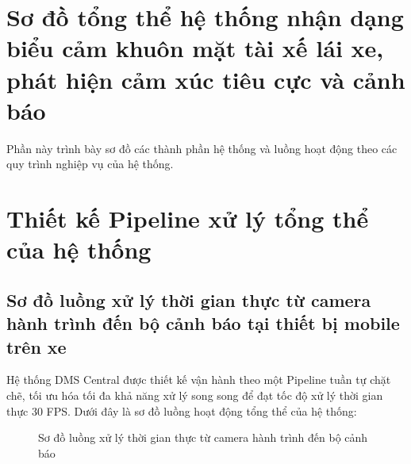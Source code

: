 \documentclass[../DoAn.tex]{subfiles}
\begin{document}
\section{Sơ đồ tổng thể hệ thống nhận dạng biểu cảm khuôn mặt tài xế lái xe, phát hiện cảm xúc tiêu cực và cảnh báo}
\label{section:4.1}
Phần này trình bày sơ đồ các thành phần hệ thống và luồng hoạt động theo các quy trình nghiệp vụ của hệ thống.

\section{Thiết kế Pipeline xử lý tổng thể của hệ thống}
\label{section:4.2}

\subsection{Sơ đồ luồng xử lý thời gian thực từ camera hành trình đến bộ cảnh báo tại thiết bị mobile trên xe}
Hệ thống DMS Central được thiết kế vận hành theo một Pipeline tuần tự chặt chẽ, tối ưu hóa tối đa khả năng xử lý song song để đạt tốc độ xử lý thời gian thực 30 FPS. Dưới đây là sơ đồ luồng hoạt động tổng thể của hệ thống:

\begin{figure}[htbp]
\centering
\caption{Sơ đồ luồng xử lý thời gian thực từ camera hành trình đến bộ cảnh báo}
\label{fig:pipeline}
\end{figure}
\end{document}
